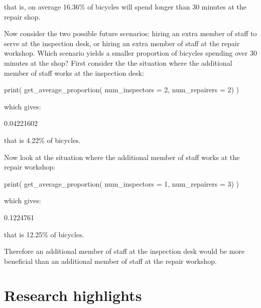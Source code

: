that is, on average 16.36\% of bicycles will spend longer than 30 minutes at the
repair shop.

Now consider the two possible future scenarios: hiring an
extra member of staff to serve at the inspection desk, or hiring an extra member
of staff at the repair workshop. Which scenario yields a smaller proportion of
bicycles spending over 30 minutes at the shop? First consider the
the situation where the additional member of staff works at the inspection desk:

\begin{Rin}
print(
  get_average_proportion(
    num_inspectors = 2,
    num_repairers = 2)
)
\end{Rin}

which gives:

\begin{Rout}
[1] 0.04221602
\end{Rout}

that is 4.22\% of bicycles.

Now look at the situation where the additional member of staff works at the
repair workshop:

\begin{Rin}
print(
  get_average_proportion(
    num_inspectors = 1,
    num_repairers = 3)
)
\end{Rin}

which gives:

\begin{Rout}
[1] 0.1224761
\end{Rout}

that is 12.25\% of bicycles.

Therefore an additional member of staff at the inspection desk would be more
beneficial than an additional member of staff at the repair workshop.

\section{Research highlights}\label{sec:research}




